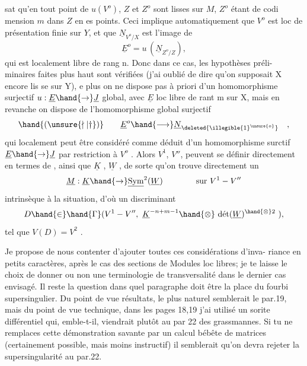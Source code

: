 
sat qu'en tout point de $u(V^{o})$, $Z$ et $Z^{o}$ sont lisses sur $M$, $Z^{o}$ étant de codi
mension $m$ dans $Z$ en es points. Ceci implique automatiquement que $V^{o}$ est
loc de présentation finie sur $Y$, et que $\underline{N}_{V^{o}/X}$ est l'image de
\xout{\deleted{\hand{(\unsure{\nmid|\dagger})}}}
\[ \underline{E}^{o} = u\,(\underline{N}_{Z^{o}/Z}) , \]
qui est localement libre de rang n. Donc dans ce cas, les hypothèses préli-%
minaires faites plus haut sont vérifiées (j'ai oublié de dire qu'on supposait
X encore lis se sur Y), e plus on ne dispose pas à priori d'un homomorphisme
surjectif $u:\underline{E}\hand{\rightarrow}\underline{J}$ global, avec $\underline{E}$ loc libre de rant m sur X, mais en revanche
on dispose de l'homomorphisme global surjectif
\[ \hand{(\unsure{\nmid|\dagger})} \qquad \underline{E}^{o}\hand{\longrightarrow} \underline{N}_{\deleted{\illegible{1}^{\unsure{o}}}} \quad , \]
qui localement peut être considéré comme déduit d'un homomorphisme surctif
$\underline{E}\hand{\rightarrow}\underline{J}$ par restriction à $V^{o}$ . Alors $V^{1}$, $V''$, peuvent se définir directement
en termes de \hand{(\unsure{\nmid|\dagger})} , ainsi que $\underline{K}$ , $\underline{W}$ , de sorte qu'on trouve directement un
\[ \underline{M} : \underline{K}\hand{\rightarrow} \underline{\mathrm{Sym}}^{2}(\underline{W}) \qquad\qquad \text{sur } V^{1}-V'' \]
intrinsèque à la situation, d'où  un discriminant
\[ D \hand{\in} \hand{\Gamma}(V^{1}-V'',\ \underline{K}^{-n+m-1}\hand{\otimes}\ \text{dét}(\underline{W})^{\hand{\otimes}2}\ ), \]
tel que $V(D) = V^{2}$ .

Je propose de nous contenter d'ajouter toutes ces considérations d'inva-%
riance en petits caractères, après le cas des sections de Modules loc libres;
je te laisse le choix de donner ou non une terminologie de transversalité dans
le dernier cas envisagé. Il reste la question dans quel paragraphe doit être
la place du fourbi supersingulier. Du point de vue résultats, le plus naturel
semblerait le par.19, mais du point de vue technique, dans les pages 18,19
j'ai utilisé un sorite différentiel qui, emble-t-il, viendrait plutôt au par
22 des grassmannes. Si tu ne remplaces cette démonstration savante par un
calcul bébête de matrices (certainement possible, mais moins instructif) il
semblerait qu'on devra rejeter la supersingularité au par.22.

